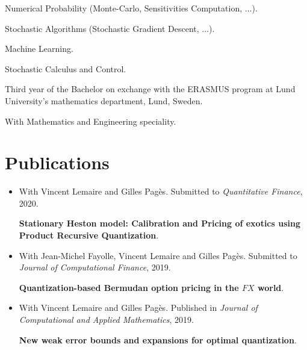 \documentclass[]{deedy-resume-openfont}
\begin{document}
\vspace{0.1cm}
\begin{tightemize}
	\item[\diamond] Numerical Probability (Monte-Carlo, Sensitivities Computation, $\dots$).
	\item[\diamond] Stochastic Algorithms (Stochastic Gradient Descent, $\dots$).
	\item[\diamond] Machine Learning.
	\item[\diamond] Stochastic Calculus and Control.
\end{tightemize}

\sectionsep
\sectionsep

Third year of the Bachelor on exchange with the ERASMUS program at Lund University's mathematics department, Lund, Sweden.

\sectionsep
\sectionsep

With Mathematics and Engineering speciality.

\newpage



	\sectionsep
	\vspace{\topsep}

	\section{Publications}
	\sectionsep
	\begin{itemize}
		\item[\diamond] With Vincent Lemaire and Gilles Pagès.  Submitted to \textit{Quantitative Finance}, 2020.

		      \textbf{Stationary Heston model: Calibration and Pricing of exotics using Product Recursive Quantization}.
		\item[\diamond] With Jean-Michel Fayolle, Vincent Lemaire and Gilles Pagès. Submitted to \textit{Journal of Computational Finance}, 2019.

		      \textbf{Quantization-based Bermudan option pricing in the $FX$ world}.
		\item[\diamond] With Vincent Lemaire and Gilles Pagès. Published in \textit{Journal of Computational and Applied Mathematics}, 2019.

		      \textbf{New weak error bounds and expansions for optimal quantization}.
	\end{itemize}
\end{document}
